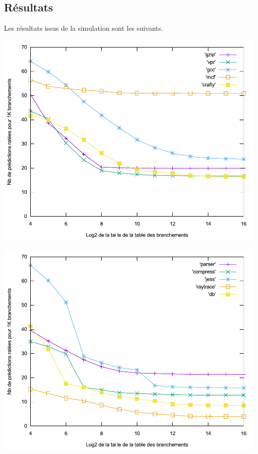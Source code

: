 \documentclass[a4paper]{article}
\begin{document}
\subsection{Résultats}
Les résultats issus de la simulation sont les suivants.
\par
\begin{minipage}{.48\linewidth}
\includegraphics[width=\linewidth]{1-bit-0}
\end{minipage}%
\hfill
\begin{minipage}{.48\linewidth}
\includegraphics[width=\linewidth]{1-bit-1}
\end{minipage}
\end{document}

